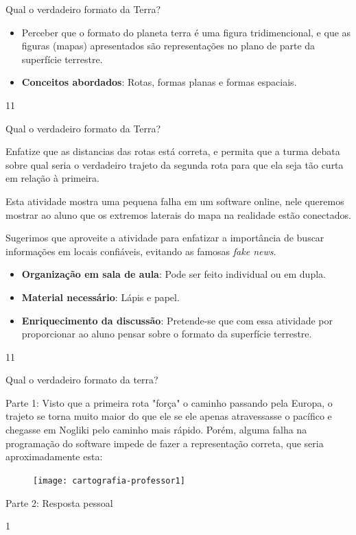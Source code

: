 \clearmargin
\begin{ObjetivoEsp}{Qual o verdadeiro formato da Terra?}
{
	\begin{itemize}
	\item Perceber que o formato do planeta terra é uma figura tridimencional, e que as figuras (mapas) apresentados são representações no plano de parte da superfície terrestre.
	\item \textbf{Conceitos abordados}: Rotas, formas planas e formas espaciais.
	\end{itemize}
}{1}{1}
\end{ObjetivoEsp}
\begin{Recomenda}{Qual o verdadeiro formato da Terra?}
{
	Enfatize que as distancias das rotas está correta, e permita que a turma debata sobre qual seria o verdadeiro trajeto da segunda rota para que ela seja tão curta em relação à primeira.

	Esta atividade mostra uma pequena falha em um software online, nele queremos mostrar ao aluno que os extremos laterais do mapa na realidade estão conectados.

	Sugerimos que aproveite a atividade para enfatizar a importância de buscar informações em locais confiáveis, evitando as famosas \textit{fake news}.

	\begin{itemize}
	\item  \textbf{Organização em sala de aula}: Pode ser feito individual ou em dupla.
	\item \textbf{Material necessário}: Lápis e papel.
	\item \textbf{Enriquecimento da discussão}: Pretende-se que com essa atividade por proporcionar ao aluno pensar sobre o formato da superfície terrestre.
	\end{itemize}
}{1}{1}
\end{Recomenda}
\begin{resposta}{Qual o verdadeiro formato da terra?}
{
	Parte 1: Visto que a primeira rota "força"{} o caminho passando pela Europa, o trajeto se torna muito maior do que ele se ele apenas atravessasse o pacífico e chegasse em Nogliki pelo caminho mais rápido. Porém, alguma falha na programação do software impede de fazer a representação correta, que seria aproximadamente esta:
	\begin{figure}[H]
	\centering
	
	\texttt{[image: cartografia-professor1]}
	\end{figure}

	Parte 2: Resposta pessoal
}{1}
\end{resposta}
